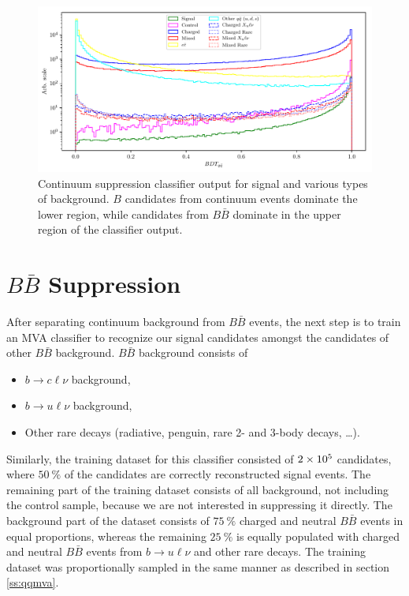 \begin{figure}[H]
	\centering
	\captionsetup{width=0.8\linewidth}
	\includegraphics[width=\linewidth]{fig/cs_BDT}
	\caption{Continuum suppression classifier output for signal and various types of background. $B$ candidates from continuum events dominate the lower region, while candidates from $B\bar B$ dominate in the upper region of the classifier output.}
	\label{fig:cs_mva}
\end{figure}

\section{$B\bar B$ Suppression}

After separating continuum background from $B \bar B$ events, the next step is to train an MVA classifier to recognize our signal candidates amongst the candidates of other $B \bar B$ background. $B \bar B$ background consists of
\begin{itemize}
	\item $b \to c \ell \nu$ background,
	\item $b \to u \ell \nu$ background,
	\item Other rare decays (radiative, penguin, rare 2- and 3-body decays, \dots).
\end{itemize}

Similarly, the training dataset for this classifier consisted of $2\times 10^{5}$ candidates, where $50~\%$ of the candidates are correctly reconstructed signal events. The remaining part of the training dataset consists of all background, not including the control sample, because we are not interested in suppressing it directly. The background part of the dataset consists of $75~\%$ charged and neutral $B \bar B$ events in equal proportions, whereas the remaining $25~\%$ is equally populated with charged and neutral $B \bar B$ events from $b \to u \ell \nu$ and other rare decays. The training dataset was proportionally sampled in the same manner as described in section \ref{ss:qqmva}.

